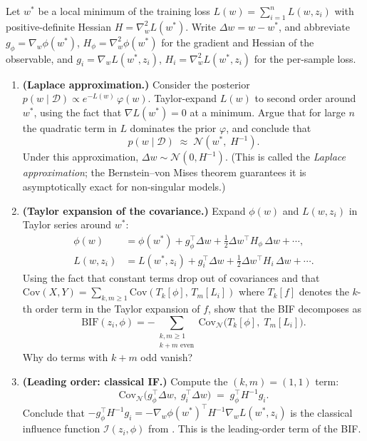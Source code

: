 \documentclass[11pt]{article}
\begin{document}
\begin{exercise}\label{ex:bif-expansion}
Let $w^*$ be a local minimum of the training loss $L(w) = \sum_{i=1}^n L(w,z_i)$ with positive-definite Hessian $H = \nabla_w^2 L(w^*)$. Write $\Delta w = w - w^*$, and abbreviate $g_\phi = \nabla_w\phi(w^*)$, $H_\phi = \nabla_w^2\phi(w^*)$ for the gradient and Hessian of the observable, and $g_i = \nabla_w L(w^*,z_i)$, $H_i = \nabla_w^2 L(w^*,z_i)$ for the per-sample loss.
\begin{enumerate}
  \item[(a)] \textbf{(Laplace approximation.)} Consider the posterior $p(w\mid\mathcal{D}) \propto e^{-L(w)}\,\varphi(w)$. Taylor-expand $L(w)$ to second order around $w^*$, using the fact that $\nabla L(w^*) = 0$ at a minimum. Argue that for large $n$ the quadratic term in $L$ dominates the prior $\varphi$, and conclude that
  \[
    p(w\mid\mathcal{D}) \;\approx\; \mathcal{N}(w^*,\;H^{-1}).
  \]
  Under this approximation, $\Delta w \sim \mathcal{N}(0, H^{-1})$. (This is called the \emph{Laplace approximation}; the Bernstein--von Mises theorem guarantees it is asymptotically exact for non-singular models.)

  \item[(b)] \textbf{(Taylor expansion of the covariance.)} Expand $\phi(w)$ and $L(w,z_i)$ in Taylor series around $w^*$:
  \begin{align*}
    \phi(w) &= \phi(w^*) + g_\phi^\top\Delta w + \tfrac{1}{2}\Delta w^\top H_\phi\,\Delta w + \cdots, \\
    L(w,z_i) &= L(w^*,z_i) + g_i^\top\Delta w + \tfrac{1}{2}\Delta w^\top H_i\,\Delta w + \cdots.
  \end{align*}
  Using the fact that constant terms drop out of covariances and that $\mathrm{Cov}(X,Y) = \sum_{k,m\ge 1}\mathrm{Cov}(T_k[\phi],\,T_m[L_i])$ where $T_k[f]$ denotes the $k$-th order term in the Taylor expansion of $f$, show that the BIF decomposes as
  \[
    \mathrm{BIF}(z_i,\phi) = -\sum_{\substack{k,m\ge 1\\k+m\text{ even}}} \mathrm{Cov}_{\mathcal{N}}\bigl(T_k[\phi],\;T_m[L_i]\bigr).
  \]
  Why do terms with $k+m$ odd vanish?

  \item[(c)] \textbf{(Leading order: classical IF.)} Compute the $(k,m) = (1,1)$ term:
  \[
    \mathrm{Cov}_{\mathcal{N}}\bigl(g_\phi^\top\Delta w,\;g_i^\top\Delta w\bigr) \;=\; g_\phi^\top H^{-1} g_i.
  \]
  Conclude that $-g_\phi^\top H^{-1}g_i = -\nabla_w\phi(w^*)^\top H^{-1}\nabla_w L(w^*,z_i)$ is the classical influence function $\mathcal{I}(z_i,\phi)$ from . This is the leading-order term of the BIF.


\end{enumerate}
\end{exercise}
\end{document}

